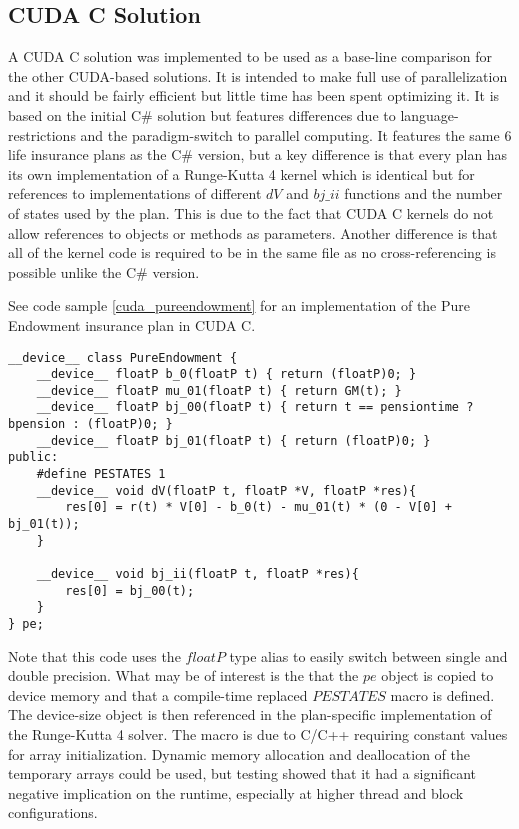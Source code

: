 \subsection{CUDA C Solution}
A CUDA C solution was implemented to be used as a base-line comparison for the other CUDA-based solutions.
It is intended to make full use of parallelization and it should be fairly efficient but little time has been spent optimizing it.
It is based on the initial C\# solution but features differences due to language-restrictions and the paradigm-switch to parallel computing.
It features the same 6 life insurance plans as the C\# version, but a key difference is that every plan has its own implementation of a Runge-Kutta 4 kernel which is identical but for references to implementations of different $dV$ and $bj\_ii$ functions and the number of states used by the plan.
This is due to the fact that CUDA C kernels do not allow references to objects or methods as parameters. %
Another difference is that all of the kernel code is required to be in the same file as no cross-referencing is possible unlike the C\# version.

See code sample \ref{cuda_pureendowment} for an implementation of the Pure Endowment insurance plan in CUDA C.
\begin{lstlisting}[language=cudac, caption=The pure endowment insurance plan expressed in CUDA C, label=cuda_pureendowment]
__device__ class PureEndowment {
	__device__ floatP b_0(floatP t) { return (floatP)0; }
	__device__ floatP mu_01(floatP t) { return GM(t); }
	__device__ floatP bj_00(floatP t) { return t == pensiontime ? bpension : (floatP)0; }
	__device__ floatP bj_01(floatP t) { return (floatP)0; }
public:
	#define PESTATES 1
	__device__ void dV(floatP t, floatP *V, floatP *res){ 
		res[0] = r(t) * V[0] - b_0(t) - mu_01(t) * (0 - V[0] + bj_01(t));
	}

	__device__ void bj_ii(floatP t, floatP *res){
		res[0] = bj_00(t);
	}
} pe;
\end{lstlisting}

Note that this code uses the $floatP$ type alias to easily switch between single and double precision.
What may be of interest is the that the $pe$ object is copied to device memory and that a compile-time replaced $PESTATES$ macro is defined.
The device-size object is then referenced in the plan-specific implementation of the Runge-Kutta 4 solver.
The macro is due to C/C++ requiring constant values for array initialization.
Dynamic memory allocation and deallocation of the temporary arrays could be used, but testing showed that it had a significant negative implication on the runtime, especially at higher thread and block configurations.

